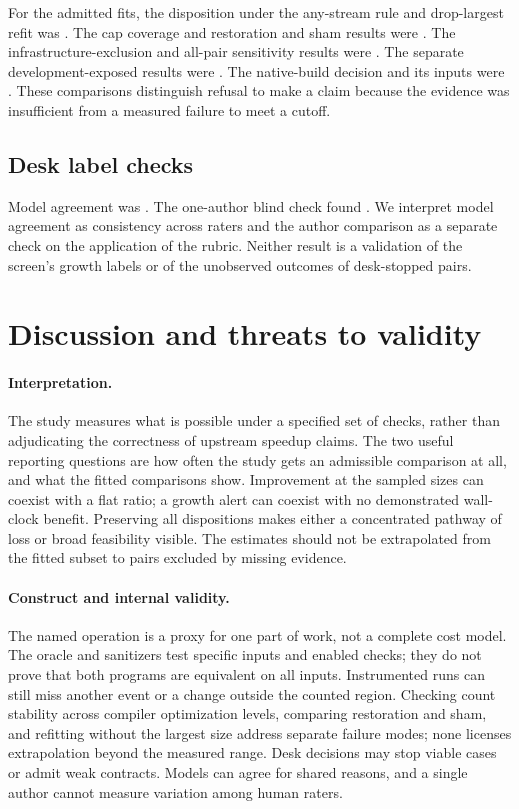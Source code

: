 \documentclass[11pt]{article}
\begin{document}
For the admitted fits, the disposition under the any-stream rule and
drop-largest refit was \BenchFitSensitivity. The cap coverage and
restoration and sham results were \BenchVariantChecks. The
infrastructure-exclusion and all-pair sensitivity results were
\BenchPairSensitivity. The separate development-exposed results were
\BenchExposedResults. The native-build decision and its inputs were
\BenchBuildDecision. These comparisons distinguish refusal to make a
claim because the evidence was insufficient from a measured failure to
meet a cutoff.

\subsection{Desk label checks}

Model agreement was \BenchModelAgreement. The one-author blind check
found \BenchAuthorCheck. We interpret model agreement as consistency
across raters and the author comparison as a separate check on the
application of the rubric. Neither result is a validation of the screen's
growth labels or of the unobserved outcomes of desk-stopped pairs.

\section{Discussion and threats to validity}

\paragraph{Interpretation.}
The study measures what is possible under a specified set of checks,
rather than adjudicating the correctness of upstream speedup claims.
The two useful reporting questions are how often the study gets an
admissible comparison at all, and what the fitted comparisons show.
Improvement at the sampled sizes can coexist with a flat ratio; a
growth alert can coexist with no demonstrated wall-clock benefit.
Preserving all dispositions makes either a concentrated pathway of loss
or broad feasibility visible. The estimates should not be extrapolated
from the fitted subset to pairs excluded by missing evidence.

\paragraph{Construct and internal validity.}
The named operation is a proxy for one part of work, not a complete cost
model. The oracle and sanitizers test specific inputs and enabled checks;
they do not prove that both programs are equivalent on all inputs.
Instrumented runs can still miss another event or a change outside the
counted region. Checking count stability across compiler optimization
levels, comparing restoration and sham, and refitting without the
largest size address separate failure modes; none licenses extrapolation
beyond the measured range. Desk decisions may stop viable cases or admit
weak contracts. Models can agree for shared reasons, and a single
author cannot measure variation among human raters.
\end{document}
